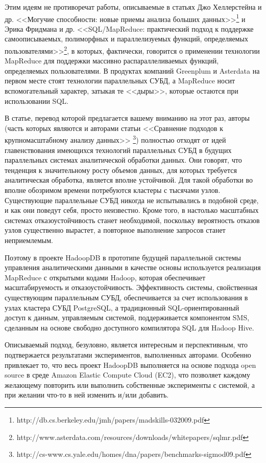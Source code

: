 Этим идеям не противоречат работы, описываемые в статьях Джо Хеллерстейна и др. <<Могучие способности: новые приемы 
анализа больших данных>>\footnote{http://db.cs.berkeley.edu/jmh/papers/madskills-032009.pdf} 
и Эрика Фридмана и др. <<SQL/MapReduce: практический подход к поддержке самоописываемых, полиморфных 
и параллелизуемых функций, определяемых пользователями>>\footnote{http://www.asterdata.com/resources/downloads/whitepapers/sqlmr.pdf}, 
в которых, фактически, говорится о применении технологии MapReduce 
для поддержки массивно распараллеливаемых функций, определяемых пользователями. В продуктах компаний Greenplum и 
Asterdata на первом месте стоят технологии параллельных СУБД, а MapReduce носит вспомогательный характер, затыкая 
те <<дыры>>, которые остаются при использовании SQL.

В статье, перевод которой предлагается вашему вниманию на этот раз, авторы (часть которых являются и авторами 
статьи <<Сравнение подходов к крупномасштабному анализу данных>>
\footnote{http://cs-www.cs.yale.edu/homes/dna/papers/benchmarks-sigmod09.pdf}) полностью отходят от идей главенствования 
имеющихся технологий параллельных СУБД в будущих параллельных системах аналитической обработки данных.
 Они говорят, что тенденция к значительному росту объемов данных, для которых требуется аналитическая обработка, 
является вполне устойчивой. Для такой обработки во вполне обозримом времени потребуются кластеры с тысячами узлов. 
Существующие параллельные СУБД никогда не испытывались в подобной среде, и как они поведут себя, просто неизвестно. 
Кроме того, в настолько масштабных системах отказоустойчивость станет необходимой, поскольку вероятность отказов 
узлов существенно вырастет, а повторное выполнение запросов станет неприемлемым. 

Поэтому в проекте HadoopDB в прототипе будущей параллельной системы управления аналитическими данными в 
качестве основы используется реализация MapReduce с открытыми кодами Hadoop, которая обеспечивает масштабируемость 
и отказоустойчивость. Эффективность системы, свойственная существующим параллельным СУБД, обеспечивается за счет 
использования в узлах кластера СУБД PostgreSQL, а традиционный SQL-ориентированный доступ к данным, управляемым системой, 
поддерживается компонентом SMS, сделанным на основе свободно доступного компилятора SQL для Hadoop Hive.

Описываемый подход, безуловно, является интересным и перспективным, что подтвержается результатами экспериментов, 
выполненных авторами. Особенно привлекает то, что весь проект HadoopDB выполняется на основе подхода open source в 
среде Amazon Elastic Compute Cloud (EC2), что позволяет каждому желающему повторить или выполнить собственные эксперименты 
с системой, а при желании что-то в ней изменить и/или добавить.

